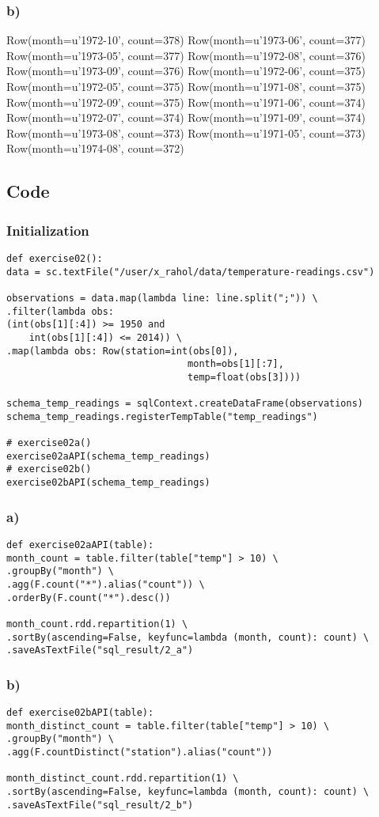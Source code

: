\documentclass[10pt]{article}
\begin{document}
\subsubsection*{b)}
\label{sec-2-1-2}
Row(month=u'1972-10', count=378)
Row(month=u'1973-06', count=377)
Row(month=u'1973-05', count=377)
Row(month=u'1972-08', count=376)
Row(month=u'1973-09', count=376)
Row(month=u'1972-06', count=375)
Row(month=u'1972-05', count=375)
Row(month=u'1971-08', count=375)
Row(month=u'1972-09', count=375)
Row(month=u'1971-06', count=374)
Row(month=u'1972-07', count=374)
Row(month=u'1971-09', count=374)
Row(month=u'1973-08', count=373)
Row(month=u'1971-05', count=373)
Row(month=u'1974-08', count=372)
\subsection*{Code}
\label{sec-2-2}
\subsubsection*{Initialization}
\label{sec-2-2-1}
\begin{verbatim}
def exercise02():
data = sc.textFile("/user/x_rahol/data/temperature-readings.csv")

observations = data.map(lambda line: line.split(";")) \
.filter(lambda obs:
(int(obs[1][:4]) >= 1950 and
    int(obs[1][:4]) <= 2014)) \
.map(lambda obs: Row(station=int(obs[0]),
                                month=obs[1][:7],
                                temp=float(obs[3])))

schema_temp_readings = sqlContext.createDataFrame(observations)
schema_temp_readings.registerTempTable("temp_readings")

# exercise02a()
exercise02aAPI(schema_temp_readings)
# exercise02b()
exercise02bAPI(schema_temp_readings)
\end{verbatim}
\subsubsection*{a)}
\label{sec-2-2-2}
\begin{verbatim}
def exercise02aAPI(table):
month_count = table.filter(table["temp"] > 10) \
.groupBy("month") \
.agg(F.count("*").alias("count")) \
.orderBy(F.count("*").desc())

month_count.rdd.repartition(1) \
.sortBy(ascending=False, keyfunc=lambda (month, count): count) \
.saveAsTextFile("sql_result/2_a")
\end{verbatim}
\subsubsection*{b)}
\label{sec-2-2-3}
\begin{verbatim}
def exercise02bAPI(table):
month_distinct_count = table.filter(table["temp"] > 10) \
.groupBy("month") \
.agg(F.countDistinct("station").alias("count"))

month_distinct_count.rdd.repartition(1) \
.sortBy(ascending=False, keyfunc=lambda (month, count): count) \
.saveAsTextFile("sql_result/2_b")
\end{verbatim}
\end{document}
